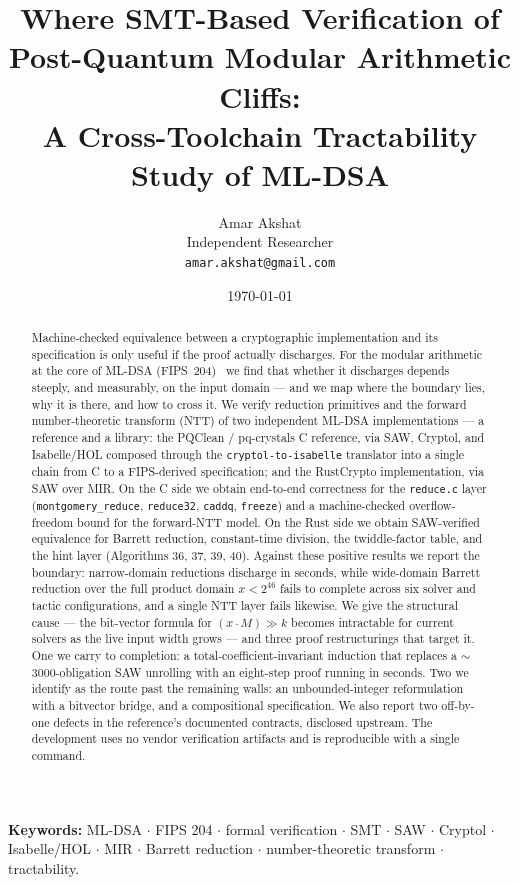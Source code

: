 \documentclass[11pt]{article}
\title{Where SMT-Based Verification of Post-Quantum Modular Arithmetic Cliffs:\\
       A Cross-Toolchain Tractability Study of ML-DSA}
\author{Amar Akshat\\Independent Researcher\\\texttt{amar.akshat@gmail.com}}
\date{\today}
\newcommand{\code}[1]{\texttt{#1}}
\begin{document}
\maketitle

\begin{abstract}
Machine-checked equivalence between a cryptographic implementation and its specification is only
useful if the proof actually discharges. For the modular arithmetic at the core of ML-DSA
(FIPS~204)~\cite{fips204} we find that whether it discharges depends steeply, and measurably, on the
input domain --- and we map where the boundary lies, why it is there, and how to cross it. We verify
reduction primitives and the forward number-theoretic transform (NTT) of two independent ML-DSA
implementations --- a reference and a library: the PQClean / pq-crystals C reference, via SAW, Cryptol,
and Isabelle/HOL composed
through the \code{cryptol-to-isabelle} translator into a single chain from C to a FIPS-derived
specification; and the RustCrypto implementation, via SAW over MIR. On the C side we obtain end-to-end
correctness for the \code{reduce.c} layer (\code{montgomery\_reduce}, \code{reduce32}, \code{caddq},
\code{freeze}) and a machine-checked overflow-freedom bound for the forward-NTT model. On the Rust side
we obtain SAW-verified equivalence for Barrett reduction, constant-time division, the twiddle-factor
table, and the hint layer (Algorithms 36, 37, 39, 40). Against these positive results we report the
boundary: narrow-domain reductions discharge in seconds, while wide-domain Barrett reduction over the
full product domain $x < 2^{46}$ fails to complete across six solver and tactic configurations, and a
single NTT layer fails likewise. We give the structural cause --- the bit-vector formula for $(x \cdot M) \gg k$
becomes intractable for current solvers as the live input width grows --- and three proof
restructurings that target it. One we carry to completion: a total-coefficient-invariant induction that
replaces a $\sim$3000-obligation SAW unrolling with an eight-step proof running in seconds. Two we
identify as the route past the remaining walls: an unbounded-integer reformulation with a bitvector
bridge, and a compositional specification. We also report
two off-by-one defects in the reference's documented contracts, disclosed upstream. The development uses
no vendor verification artifacts and is reproducible with a single command.
\end{abstract}

\medskip
\noindent\textbf{Keywords:} ML-DSA $\cdot$ FIPS 204 $\cdot$ formal verification $\cdot$ SMT
$\cdot$ SAW $\cdot$ Cryptol $\cdot$ Isabelle/HOL $\cdot$ MIR $\cdot$ Barrett reduction $\cdot$
number-theoretic transform $\cdot$ tractability.
\end{document}
